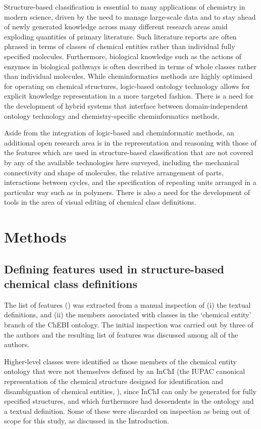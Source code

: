 \documentclass[10pt]{bmc_article}
\newenvironment{bmcformat}{\baselineskip20pt\sloppy\setboolean{publ}{false}}{\baselineskip20pt\sloppy}
\begin{document}
\begin{bmcformat}
Structure-based classification is essential to many applications of chemistry in modern science, driven by the need to manage large-scale data and to stay ahead of newly generated knowledge across many different research areas amid exploding quantities of primary literature. Such literature reports are often phrased in terms of classes of chemical entities rather than individual fully specified molecules. Furthermore, biological knowledge such as the actions of enzymes in biological pathways is often described in terms of whole classes rather than individual molecules. While cheminformatics methods are highly optimised for operating on chemical structures, logic-based ontology technology allows for explicit knowledge representation in a more targeted fashion. There is a need for the development of hybrid systems that interface between domain-independent ontology technology and chemistry-specific cheminformatics methods. 

Aside from the integration of logic-based and cheminformatic methods, an additional open research area is in the representation and reasoning with those of the features which are used in structure-based classification that are not covered by any of the available technologies here surveyed, including the mechanical connectivity and shape of molecules, the relative arrangement of parts, interactions between cycles, and the specification of repeating units arranged in a particular way such as in polymers. There is also a need for the development of tools in the area of visual editing of chemical class definitions. 


\section*{Methods}

\subsection*{Defining features used in structure-based chemical class definitions}

The list of features (\textit{}) was extracted from a manual inspection of (i) the textual definitions, and (ii) the members associated with classes in the `chemical entity' branch of the ChEBI ontology. The initial inspection was carried out by three of the authors and the resulting list of features was discussed among all of the authors. 

Higher-level classes were identified as those members of the chemical entity ontology that were not themselves defined by an InChI (the IUPAC canonical representation of the chemical structure designed for identification and disambiguation of chemical entities, \cite{inchi}), since InChI can only be generated for fully specified structures, and which furthermore had descendents in the ontology and a textual definition.  Some of these were discarded on inspection as being out of scope for this study, as discussed in the Introduction. 


\end{bmcformat}
\end{document}
